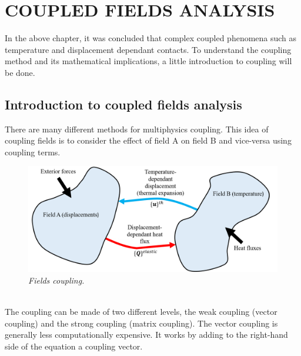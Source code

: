 \section{COUPLED FIELDS ANALYSIS} \label{ch_5.4}
\normalsize{In the above chapter, it was concluded that complex coupled phenomena such as temperature and displacement dependant contacts. To understand the coupling method and its mathematical implications, a little introduction to coupling will be done.}
\subsection{Introduction to coupled fields analysis}
\normalsize{There are many different methods for multiphysics coupling. This idea of coupling fields is to consider the effect of field A on field B and vice-versa using coupling terms.}
\\
\begin{figure}[!ht]
    \label{fig_5_21}
    \centering
    \includegraphics[width=1\textwidth]{figures/patateCoupling.png}
    \caption{\it Fields coupling.}
\end{figure}
\\
\normalsize{The coupling can be made of two different levels, the weak coupling (vector coupling) and the strong coupling (matrix coupling). The vector coupling is generally less computationally expensive. It works by adding to the right-hand side of the equation a coupling vector.}
\\

